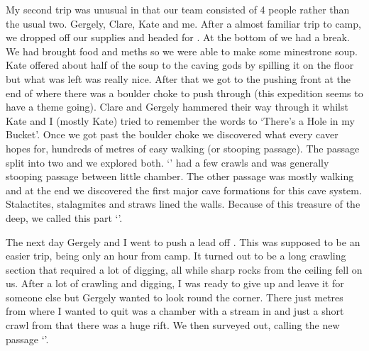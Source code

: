 My second trip was unusual in that our team consisted of 4 people rather than the usual two. Gergely, Clare, Kate and me. After a almost familiar trip to camp, we dropped off our supplies and headed for . At the bottom of  we had a break. We had brought food and meths so we were able to make some minestrone soup. Kate offered about half of the soup to the caving gods by spilling it on the floor but what was left was really nice. After that we got to the pushing front at the end of  where there was a boulder choke to push through (this expedition seems to have a theme going). Clare and Gergely hammered their way through it whilst Kate and I (mostly Kate) tried to remember the words to ‘There’s a Hole in my Bucket’. Once we got past the boulder choke we discovered what every caver hopes for, hundreds of metres of easy walking (or stooping passage). The passage split into two and we explored both. ‘’ had a few crawls and was generally stooping passage between little chamber. The other passage was mostly walking and at the end we discovered the first major cave formations for this cave system. Stalactites, stalagmites and straws lined the walls. Because of this treasure of the deep, we called this part ‘’.

The next day Gergely and I went to push a lead off . This was supposed to be an easier trip, being only an hour from camp. It turned out to be a long crawling section that required a lot of digging, all while sharp rocks from the ceiling fell on us. After a lot of crawling and digging, I was ready to give up and leave it for someone else but Gergely wanted to look round the corner. There just metres from where I wanted to quit was a chamber with a stream in and just a short crawl from that there was a huge rift. We then surveyed out, calling the new passage ‘’.

